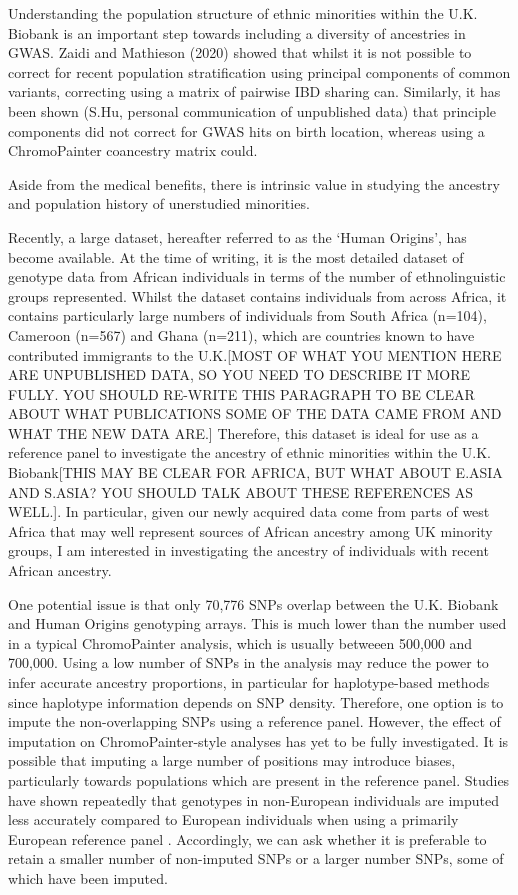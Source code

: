 Understanding the population structure of ethnic minorities within the U.K. Biobank is an important step towards including a diversity of ancestries in GWAS. Zaidi and Mathieson (2020) \cite{zaidi2020demographic} showed that whilst it is not possible to correct for recent population stratification using principal components of common variants, correcting using a matrix of pairwise IBD sharing can. Similarly, it has been shown (S.Hu, personal communication of unpublished data) that principle components did not correct for GWAS hits on birth location, whereas using a ChromoPainter coancestry matrix could. 

Aside from the medical benefits, there is intrinsic value in studying the ancestry and population history of unerstudied minorities. 


Recently, a large dataset, hereafter referred to as the `Human Origins', has become available. At the time of writing, it is the most detailed dataset of genotype data from African individuals in terms of the number of ethnolinguistic groups represented. Whilst the dataset contains individuals from across Africa, it contains particularly large numbers of individuals from South Africa (n=104), Cameroon (n=567) and Ghana (n=211), which are countries known to have contributed immigrants to the U.K.{\color{red}[MOST OF WHAT YOU MENTION HERE ARE UNPUBLISHED DATA, SO YOU NEED TO DESCRIBE IT MORE FULLY. YOU SHOULD RE-WRITE THIS PARAGRAPH TO BE CLEAR ABOUT WHAT PUBLICATIONS SOME OF THE DATA CAME FROM AND WHAT THE NEW DATA ARE.]} Therefore, this dataset is ideal for use as a reference panel to investigate the ancestry {\color{red}of ethnic minorities within the U.K. Biobank[THIS MAY BE CLEAR FOR AFRICA, BUT WHAT ABOUT E.ASIA AND S.ASIA? YOU SHOULD TALK ABOUT THESE REFERENCES AS WELL.]}. In particular, {\color{red}given our newly acquired data come from parts of west Africa that may well represent sources of African ancestry among UK minority groups,} I am interested in investigating the ancestry of individuals with recent African ancestry. 

One potential issue is that only 70,776 SNPs overlap between the U.K. Biobank and Human Origins genotyping arrays. This is much lower than the number used in a typical ChromoPainter analysis, which is usually betweeen 500,000 and 700,000. Using a low number of SNPs in the analysis may reduce the power to infer accurate ancestry proportions, {\color{red}in particular for haplotype-based methods since haplotype information depends on SNP density}. Therefore, one option is to impute the non-overlapping SNPs using a reference panel. However, the effect of imputation on ChromoPainter-style analyses has yet to be fully investigated. It is possible that imputing a large number of positions may introduce biases, particularly towards populations which are present in the reference panel. Studies have shown repeatedly that genotypes in non-European individuals are imputed less accurately compared to European individuals when using a primarily European reference panel \cite{delaneau2018integrative, taliun2021sequencing}. Accordingly, we can ask whether it is preferable to retain a smaller number of non-imputed SNPs or a larger number SNPs, some of which have been imputed. 

